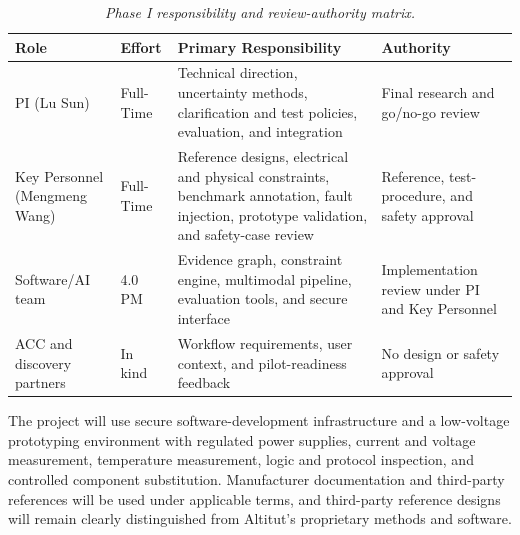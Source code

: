 \documentclass[11pt,letterpaper]{article}
\begin{document}
\vspace{-3pt}
\begin{table}[H]
\centering
\small
\begin{tabularx}{\textwidth}{P{0.17\textwidth}P{0.10\textwidth}YP{0.16\textwidth}}

\toprule
{\textbf{Role}} &
{\textbf{Effort}} &
{\textbf{Primary Responsibility}} &
{\textbf{Authority}} \\
\midrule

PI (Lu Sun) &
Full-Time &
Technical direction, uncertainty methods, clarification and test policies, evaluation, and integration &
Final research and go/no-go review \\

Key Personnel (Mengmeng Wang) &
Full-Time &
Reference designs, electrical and physical constraints, benchmark annotation, fault injection, prototype validation, and safety-case review &
Reference, test-procedure, and safety approval \\

Software/AI team &
4.0 PM &
Evidence graph, constraint engine, multimodal pipeline, evaluation tools, and secure interface &
Implementation review under PI and Key Personnel \\

ACC and discovery partners &
In kind &
Workflow requirements, user context, and pilot-readiness feedback &
No design or safety approval \\

\bottomrule
\end{tabularx}
\caption{\textit{Phase I responsibility and review-authority matrix.}}
\label{tab:team}
\end{table}
\vspace{-10pt}

The project will use secure software-development infrastructure and a low-voltage prototyping environment with regulated power supplies, current and voltage measurement, temperature measurement, logic and protocol inspection, and controlled component substitution. Manufacturer documentation and third-party references will be used under applicable terms, and third-party reference designs will remain clearly distinguished from Altitut's proprietary methods and software.
\end{document}
